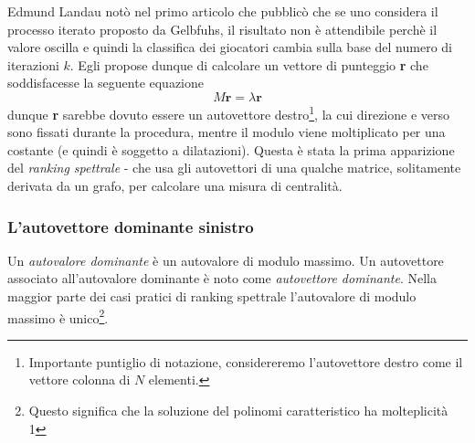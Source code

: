 Edmund Landau \cite{landau} notò nel primo articolo che pubblicò \cite{landaus} che se uno considera il processo iterato proposto da Gelbfuhs, il risultato non è attendibile perchè il valore oscilla e quindi la classifica dei giocatori cambia sulla base del numero di iterazioni $k$. Egli propose dunque di calcolare un vettore di punteggio \textbf{r} che soddisfacesse la seguente equazione
\begin{equation}
    M\textbf{r} = \lambda \textbf{r}
\end{equation}
dunque \textbf{r} sarebbe dovuto essere un autovettore destro\footnote{Importante puntiglio di
notazione, considereremo l'autovettore destro come il vettore colonna di $N$ elementi.}, la cui direzione e verso sono fissati durante la procedura, mentre il modulo viene moltiplicato per una costante (e quindi è soggetto a dilatazioni). Questa è stata la prima apparizione del \textit{ranking spettrale} - che usa gli autovettori di una qualche matrice, solitamente derivata da un grafo, per calcolare una misura di centralità.
\subsubsection{L'autovettore dominante sinistro}
Un \textit{autovalore dominante} è un autovalore di modulo massimo. Un autovettore associato all'autovalore dominante è noto come \textit{autovettore dominante}. Nella maggior parte dei casi pratici di ranking spettrale l'autovalore di modulo massimo è unico\footnote{Questo significa che la soluzione del polinomi caratteristico ha molteplicità 1}.


